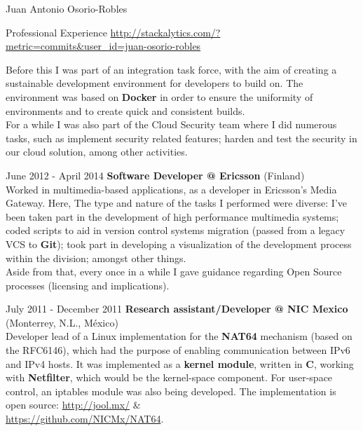 \documentclass[english,11pt,letterpaper]{article}
\begin{document}
\begin{cv}{Juan Antonio Osorio-Robles}
\begin{cvlist}{Professional Experience}
            \href{http://stackalytics.com/?metric=commits&user_id=juan-osorio-robles}
            {\url{http://stackalytics.com/?metric=commits&user_id=juan-osorio-robles}}

            Before this I was part of an integration task force, with the
            aim of creating a sustainable development environment for
            developers to build on. The environment was based on
            \textbf{Docker} in order to ensure the uniformity of
            environments and to create quick and consistent builds.\\

            For a while I was also part of the Cloud Security team where
            I did numerous tasks, such as implement security related
            features; harden and test the security in our cloud solution,
            among other activities.

		\item [June 2012 - April 2014]
            \textbf{Software Developer @ Ericsson} (Finland)\\
            Worked in multimedia-based applications, as a developer in
            Ericsson's Media Gateway. Here, The type and nature of the
            tasks I performed were diverse: I've been taken part in the
            development of high performance multimedia systems; coded
            scripts to aid in version control systems migration (passed
            from a legacy VCS to \textbf{Git}); took part in developing a
            visualization of the development process within the division;
            amongst other things.\\

            Aside from that, every once in a while I gave guidance
            regarding Open Source processes (licensing and implications).

		\item [July 2011 - December 2011]
            \textbf{Research assistant/Developer @ NIC Mexico} (Monterrey,
            N.L., M\'{e}xico)\\
            Developer lead of a Linux implementation for the \textbf{NAT64}
            mechanism (based on the RFC6146), which had the purpose of
            enabling communication between IPv6 and IPv4 hosts. It was
            implemented as a \textbf{kernel module}, written in \textbf{C},
            working with \textbf{Netfilter}, which would be the kernel-space
            component. For user-space control, an iptables module was also
            being developed. The implementation is open source:
            \href{http://jool.mx/}{http://jool.mx/} \&\\
            \href{https://github.com/NICMx/NAT64}{https://github.com/NICMx/NAT64}.


\end{cvlist}
\end{cv}
\end{document}
